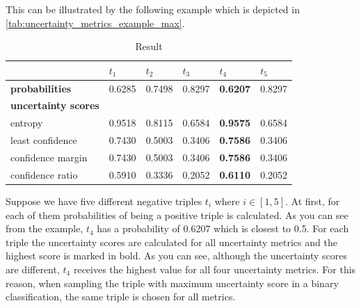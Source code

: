 This can be illustrated by the following example which is depicted in \autoref{tab:uncertainty_metrics_example_max}.
\begin{table}[h]
    \centering
    \begin{tabular}{llllll}
        \toprule
        
        &  \textbf{$t_1$} & \textbf{$t_2$} & \textbf{$t_3$} & \textbf{$t_4$} & \textbf{$t_5$} \\
         
        \midrule
        
        \textbf{probabilities}
        & 0.6285 & 0.7498 & 0.8297 & \textbf{0.6207} & 0.8297   \\
        
        \midrule
        \textbf{uncertainty scores}
        & & & & & \\
        
        entropy 
        & 0.9518 & 0.8115 &  0.6584 & \textbf{0.9575} & 0.6584 \\
        
        least confidence 
        & 0.7430 & 0.5003 & 0.3406 & \textbf{0.7586} & 0.3406 \\ 
        
        confidence margin
        & 0.7430 & 0.5003 & 0.3406 & \textbf{0.7586} & 0.3406 \\
        
        confidence ratio
        & 0.5910 & 0.3336 & 0.2052 & \textbf{0.6110} & 0.2052 \\
        
        \bottomrule
    \end{tabular}
    \caption{Result}
\label{tab:uncertainty_metrics_example_max}
\end{table}
Suppose we have five different negative triples $t_i$ where $i \in [1,5]$.
At first, for each of them probabilities of being a positive triple is calculated.
As you can see from the example, $t_4$ has a probability of 0.6207 which is closest to 0.5.
For each triple the  uncertainty scores are calculated for all uncertainty metrics and the highest score is marked in bold.
As you can see, although the uncertainty scores are different, $t_4$ receives the highest value for all four uncertainty metrics.
For this reason, when sampling the triple with maximum uncertainty score in a binary classification, the same triple is chosen for all metrics.

